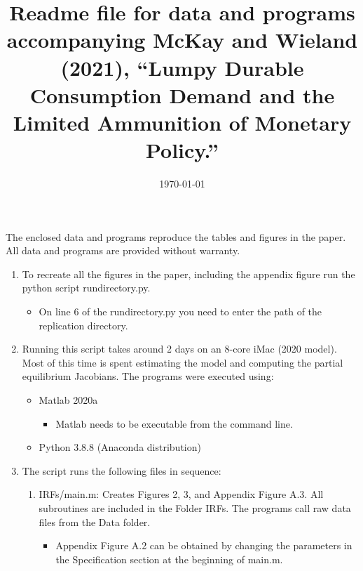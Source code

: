 \documentclass[12pt,twoside]{article}
\begin{document}

\title{Readme file for data and programs accompanying McKay and Wieland (2021), ``Lumpy Durable Consumption Demand and the Limited Ammunition of Monetary Policy.''}
\date{\today}

\maketitle

The enclosed data and programs reproduce the tables and figures in
the paper. All data and programs are provided without warranty. 

\begin{enumerate}
\item To recreate all the figures in the paper, including the appendix figure run the python script rundirectory.py.
\begin{itemize}
	\item On line 6 of the rundirectory.py you need to enter the path of the replication directory.
\end{itemize}
\item Running this script takes around 2 days on an 8-core iMac (2020 model). Most of this time is spent estimating the model and computing the partial equilibrium Jacobians. The programs were executed using:
\begin{itemize}
	\item Matlab 2020a
	\begin{itemize}
		\item Matlab needs to be executable from the command line.
	\end{itemize}
	\item Python 3.8.8 (Anaconda distribution)
\end{itemize}
\item The script runs the following files in sequence:
\begin{enumerate}
	\item IRFs/main.m: Creates Figures 2, 3, and Appendix Figure A.3. All subroutines are included in the Folder IRFs. The programs call raw data files from the Data folder.
\begin{itemize}
	\item Appendix Figure A.2 can be obtained by changing the parameters in the Specification section at the beginning of main.m.
\end{itemize}

\end{enumerate}
\end{enumerate}
\end{document}
